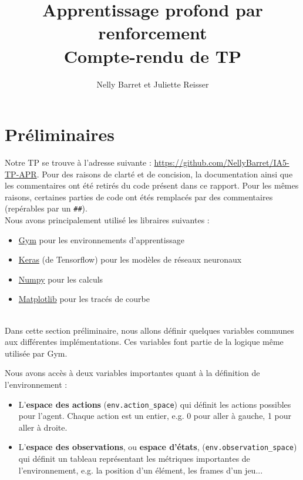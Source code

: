 \documentclass[10pt,a4paper]{article}
\title{Apprentissage profond par renforcement \\ Compte-rendu de TP}
\author{Nelly Barret et Juliette Reisser}
\begin{document}
\maketitle

\section{Préliminaires} \label{prelim}
Notre TP se trouve à l'adresse suivante : \href{https://github.com/NellyBarret/IA5-TP-APR}{https://github.com/NellyBarret/IA5-TP-APR}. Pour des raisons de clarté et de concision, la documentation ainsi que les commentaires ont été retirés du code présent dans ce rapport. Pour les mêmes raisons, certaines parties de code ont étés remplacés par des commentaires (repérables par un \lstinline{##}). \\

Nous avons principalement utilisé les libraires suivantes :
\begin{itemize}
	\item \href{https://gym.openai.com/}{Gym} pour les environnements d'apprentissage
	\item \href{https://keras.io/}{Keras} (de Tensorflow) pour les modèles de réseaux neuronaux
	\item \href{https://numpy.org/}{Numpy} pour les calculs
	\item \href{https://matplotlib.org/index.html}{Matplotlib} pour les tracés de courbe
\end{itemize}
~\\

Dans cette section préliminaire, nous allons définir quelques variables communes aux différentes implémentations. Ces variables font partie de la logique même utilisée par Gym.

Nous avons accès à deux variables importantes quant à la définition de l'environnement :
\begin{itemize}
	\item L'\textbf{espace des actions} (\lstinline{env.action_space}) qui définit les actions possibles pour l'agent. Chaque action est un entier, e.g. 0 pour aller à gauche, 1 pour aller à droite.
	\item L'\textbf{espace des observations}, ou \textbf{espace d'états}, (\lstinline{env.observation_space}) qui définit un tableau représentant les métriques importantes de l'environnement, e.g. la position d'un élément, les frames d'un jeu...
\end{itemize}
\end{document}
